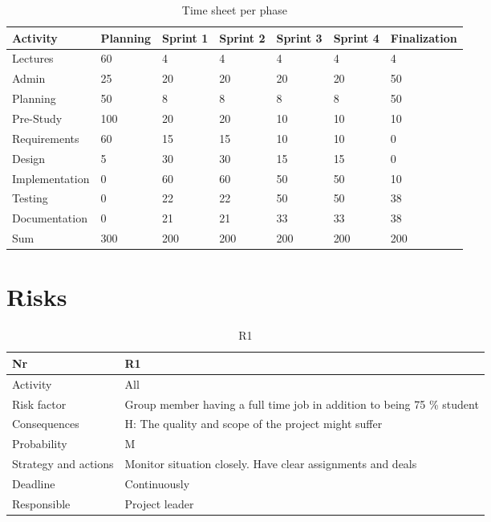 \documentclass[11pt]{book}
\begin{document}
\begin{table}[H]
\centering
\begin{tabular}{ l | l l l l l l }

Activity & Planning & Sprint 1 & Sprint 2 & Sprint 3 & Sprint 4 & Finalization\\
\hline
Lectures & 60 & 4 & 4 & 4 & 4 & 4\\
\hline
Admin & 25 & 20 & 20 & 20 & 20 & 50\\
\hline
Planning & 50 & 8 & 8 & 8 & 8 & 50\\
\hline
Pre-Study & 100 & 20 & 20 & 10 & 10 & 10\\
\hline
Requirements & 60 & 15 & 15 & 10 & 10 & 0\\
\hline
Design & 5 & 30 & 30 & 15 & 15 & 0\\
\hline
Implementation & 0 & 60 & 60 & 50 & 50 & 10\\
\hline
Testing & 0 & 22 & 22 & 50 & 50 & 38\\
\hline
Documentation & 0 & 21 & 21 & 33 & 33 & 38\\
\hline
Sum & 300 & 200 & 200 & 200 & 200 & 200
\end{tabular}
\label{tab:plan_time_per_phase}
\caption{Time sheet per phase}
\end{table}

\section{Risks}

\begin{table}[H]
\centering
\begin{tabular}{ l  p{11cm} }
Nr & R1\\
\hline
Activity & All\\
\hline
Risk factor & Group member having a full time job in addition to being 75 \% student\\
\hline
Consequences & H: The quality and scope of the project might suffer\\
\hline
Probability & M\\
\hline
Strategy and actions & Monitor situation closely. Have clear assignments and deals\\
\hline
Deadline & Continuously\\
\hline
Responsible & Project leader\\

\end{tabular}
\label{tab:risk_1}
\caption{R1}
\end{table}
\end{document}
